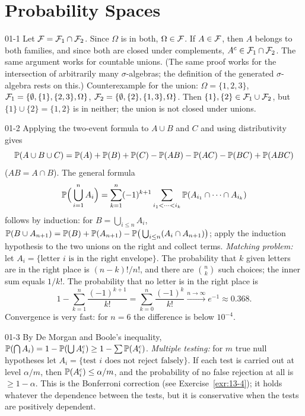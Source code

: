 
\section{Probability Spaces}

\begin{solution}{01-1}
Let $\F=\F_1\cap\F_2$. Since $\Omega$ is in both, $\Omega\in\F$. If $A\in\F$, then $A$ belongs to both families, and since both are closed under complements, $A^c\in\F_1\cap\F_2$. The same argument works for countable unions. (The same proof works for the intersection of arbitrarily many $\sigma$-algebras; the definition of the generated $\sigma$-algebra rests on this.)
Counterexample for the union: $\Omega=\{1,2,3\}$, $\F_1=\{\emptyset,\{1\},\{2,3\},\Omega\}$, $\F_2=\{\emptyset,\{2\},\{1,3\},\Omega\}$. Then $\{1\},\{2\}\in\F_1\cup\F_2$, but $\{1\}\cup\{2\}=\{1,2\}$ is in neither; the union is not closed under unions.
\end{solution}

\begin{solution}{01-2}
Applying the two-event formula to $A\cup B$ and $C$ and using distributivity gives
\[
\P(A\cup B\cup C)=\P(A)+\P(B)+\P(C)-\P(AB)-\P(AC)-\P(BC)+\P(ABC)
\]
($AB=A\cap B$). The general formula
\[
\P\Big(\bigcup_{i=1}^nA_i\Big)=\sum_{k=1}^n(-1)^{k+1}\sum_{i_1<\dots<i_k}\P(A_{i_1}\cap\dots\cap A_{i_k})
\]
follows by induction: for $B=\bigcup_{i\le n}A_i$, $\P(B\cup A_{n+1})=\P(B)+\P(A_{n+1})-\P\big(\bigcup_{i\le n}(A_i\cap A_{n+1})\big)$; apply the induction hypothesis to the two unions on the right and collect terms.
\emph{Matching problem:} let $A_i=\{\text{letter } i \text{ is in the right envelope}\}$. The probability that $k$ given letters are in the right place is $(n-k)!/n!$, and there are $\binom nk$ such choices; the inner sum equals $1/k!$. The probability that no letter is in the right place is
\[
1-\sum_{k=1}^n\frac{(-1)^{k+1}}{k!}=\sum_{k=0}^n\frac{(-1)^k}{k!}\xrightarrow{n\to\infty}e^{-1}\approx0.368 .
\]
Convergence is very fast: for $n=6$ the difference is below $10^{-4}$.
\end{solution}

\begin{solution}{01-3}
By De Morgan and Boole's inequality, $\P(\bigcap A_i)=1-\P(\bigcup A_i^c)\ge1-\sum\P(A_i^c)$.
\emph{Multiple testing:} for $m$ true null hypotheses let $A_i=\{\text{test } i \text{ does not reject falsely}\}$. If each test is carried out at level $\alpha/m$, then $\P(A_i^c)\le\alpha/m$, and the probability of no false rejection at all is $\ge1-\alpha$. This is the Bonferroni correction (see Exercise~\ref{exr:13-4}); it holds whatever the dependence between the tests, but it is conservative when the tests are positively dependent.
\end{solution}

